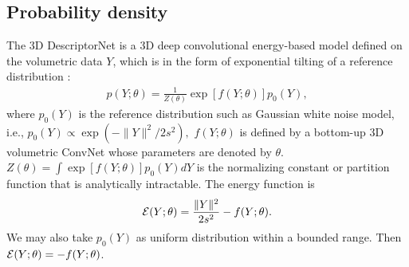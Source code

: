 \documentclass[10pt,twocolumn,letterpaper]{article}
\begin{document}
\subsection{Probability density}
The 3D DescriptorNet is a 3D deep convolutional energy-based model defined on the volumetric data $Y$, which is in the form of exponential tilting of a reference distribution \cite{XieLuICML}: 
\begin{eqnarray} 
   p(Y; \theta) = \frac{1}{Z(\theta)} \exp\left[ f(Y; \theta)\right] p_0(Y), 
\end{eqnarray}
 where $p_0(Y)$ is the reference distribution such as Gaussian white noise model, i.e.,
$ p_0(Y) \propto \exp \left( -{\|Y\|^2}/{2 s^2}\right), 
$  
 $f(Y; \theta)$ is defined by a bottom-up 3D volumetric ConvNet whose parameters are denoted by $\theta$. $Z(\theta) = \int  \exp\left[ f(Y; \theta)\right] p_0(Y) dY$ is the normalizing constant or partition function that is analytically intractable. The energy function is
 \begin{eqnarray}{\cal E}(Y; \theta) = \frac{\|Y\|^2}{2s^2} - f(Y; \theta). 
\end{eqnarray}
We may also take $p_0(Y)$ as uniform distribution within a bounded range. Then ${\cal E}(Y; \theta) = - f(Y; \theta)$. 
\end{document}
